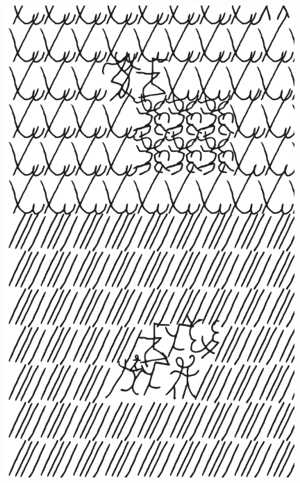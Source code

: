 \makeatletter\@openrightfalse
\movetooddpage
\begin{absolutelynopagebreak}
\begin{vplace}
\begin{figure}[H]
\begin{adjustwidth}{-0.99cm}{}
  \centering
  \vspace*{-1.77cm}
  \hspace*{-0.45cm}
  \includegraphics[width=110mm]{./imgs/img13.pdf}  
  \hfill
\end{adjustwidth}

\thispagestyle{empty}

\end{figure}
\end{vplace}

\end{absolutelynopagebreak}

